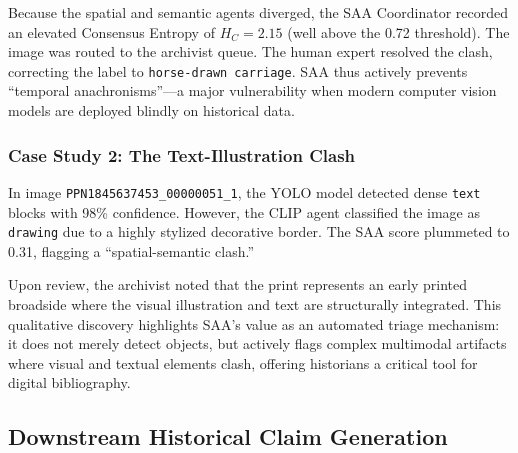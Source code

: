 \documentclass[12pt,onecolumn,a4paper]{IEEEtran}
\begin{document}
Because the spatial and semantic agents diverged, the SAA Coordinator recorded an elevated Consensus Entropy of $H_C = 2.15$ (well above the 0.72 threshold). The image was routed to the archivist queue. The human expert resolved the clash, correcting the label to \texttt{horse-drawn carriage}. SAA thus actively prevents ``temporal anachronisms''—a major vulnerability when modern computer vision models are deployed blindly on historical data.

\subsubsection{Case Study 2: The Text-Illustration Clash}
In image \texttt{PPN1845637453\_00000051\_1}, the YOLO model detected dense \texttt{text} blocks with 98\% confidence. However, the CLIP agent classified the image as \texttt{drawing} due to a highly stylized decorative border. The SAA score plummeted to 0.31, flagging a ``spatial-semantic clash.'' 

Upon review, the archivist noted that the print represents an early printed broadside where the visual illustration and text are structurally integrated. This qualitative discovery highlights SAA's value as an automated triage mechanism: it does not merely detect objects, but actively flags complex multimodal artifacts where visual and textual elements clash, offering historians a critical tool for digital bibliography.

\subsection{Downstream Historical Claim Generation}
\label{sec:downstream_claims}
\end{document}
